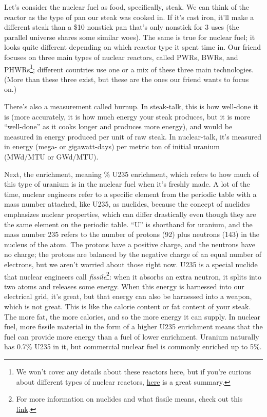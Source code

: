 {Let's consider the nuclear fuel as food, specifically, steak. We can think of
the reactor as the type of pan our steak was cooked in. If it's cast iron,
it'll make a different steak than a \$10 nonstick pan that's only nonstick for
3 uses (the parallel universe shares some similar woes). The same is true for
nuclear fuel; it looks quite different depending on which reactor type it spent
time in. Our friend focuses on three main types of nuclear reactors, called
\glspl{PWR}, \glspl{BWR}, and \glspl{PHWR}\footnote{We won't cover any details
about these reactors here, but if you're curious about different types of
nuclear reactors,
\href{http://www.world-nuclear.org/uploadedFiles/org/WNA/Publications/Nuclear\_Information/Pocket\%20Guide\%20Reactors.pdf}{\color{violet}here}
is a great summary.}; different countries use one or a mix of these three main
technologies. (More than these three exist, but these are the ones our friend
wants to focus on.) 

There's also a measurement called burnup. In steak-talk, this is how well-done
it is (more accurately, it is how much energy your steak produces, but it is
more ``well-done'' as it cooks longer and produces more energy), and would be
measured in energy produced per unit of raw steak. In nuclear-talk, it's
measured in energy (mega- or gigawatt-days) per metric ton of initial uranium
(MWd/MTU or GWd/MTU). 

Next, the enrichment, meaning \% \gls{U235} enrichment, which refers to how
much of this type of uranium is in the nuclear fuel when it's freshly made.  A
lot of the time, nuclear engineers refer to a specific element from the
periodic table with a mass number attached, like \gls{U235}, as nuclides,
because the concept of nuclides emphasizes nuclear properties, which can differ
drastically even though they are the same element on the periodic table. ``U'' is
shorthand for uranium, and the mass number 235 refers to the number of protons
(92) plus neutrons (143) in the nucleus of the atom. The protons have a
positive charge, and the neutrons have no charge; the protons are balanced by
the negative charge of an equal number of electrons, but we aren't worried
about those right now. \gls{U235} is a special nuclide that nuclear engineers
call \textit{fissile}\footnote{For more information on nuclides and what
fissile means, check out this
\href{https://whatisnuclear.com/isotopes.html}{\color{violet}link}.}: when it
absorbs an extra neutron, it splits into two atoms and releases some energy.
When this energy is harnessed into our electrical grid, it's great, but that
energy can also be harnessed into a weapon, which is not great. This is like
the calorie content or fat content of your steak. The more fat, the more
calories, and so the more energy it can supply. In nuclear fuel, more fissile
material in the form of a higher \gls{U235} enrichment means that the fuel can
provide more energy than a fuel of lower enrichment. Uranium naturally has
0.7\% \gls{U235} in it, but commercial nuclear fuel is commonly enriched up to
5\%.

}
